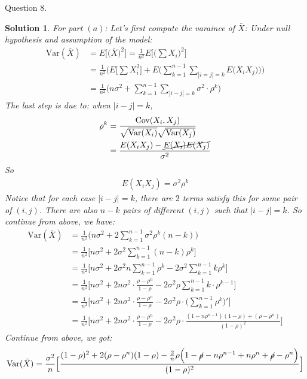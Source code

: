 \documentclass[11pt]{article}
\newtheorem{sol}{Solution}
\begin{document}
Question $8.$
\begin{sol}
	For part $(a)$:\vskip 2mm
	Let's first compute the varaince of $\bar{X}$:\vskip 2mm
	Under null hypothesis and assumption of the model:
	\begin{align*}
		\text{Var}(\bar{X}) &= E\Big[\Big(\bar{X}\Big)^2\Big] = \frac{1}{n^2}E\Big[\Big(\sum       X_i\Big)^2\Big]\\
		&= \frac{1}{n^2}\Big(E\Big[\sum X_i^2\Big] + E\Big(\sum_{k = 1}^{n - 1}\sum_{|i = j| = k}E\Big(X_iX_j\Big)\Big)\Big)\\
		&= \frac{1}{n^2}\Big(n\sigma^2 + \sum_{k = 1}^{n - 1}\sum_{|i - j| = k}\sigma^2\cdot \rho^k\Big)
	\end{align*}
	The last step is due to: when $|i - j|= k$, 
	\begin{align*}
		\rho^k &= \frac{\text{Cov}(X_i, X_j)}{\sqrt{\text{Var}(X_i)}\sqrt{\text{Var}(X_j)}}\\
		&= \frac{E(X_iX_j) - \cancel{E(X_i)E(X_j)}}{\sigma^2}
	\end{align*}
	So
	\begin{align*}
		E(X_iX_j) = \sigma^2\rho^{k}
	\end{align*}
	Notice that for each case $|i - j| = k$, there are $2$ terms satisfy this for same pair of $(i, j)$. There are also $n - k$ pairs of different $(i, j)$ such that $|i - j| = k$. So continue from above, we have:
	\begin{align*}
		\text{Var}(\bar{X}) &= \frac{1}{n^2}\Big(n\sigma^2 + 2\sum_{k = 1}^{n- 1}\sigma^2\rho^k(n - k)\Big)\\
		&= \frac{1}{n^2}\Big[n\sigma^2 + 2\sigma^2\sum_{k = 1}^{n - 1}(n - k)\rho^k\Big]\\
		&= \frac{1}{n^2}\Big[n\sigma^2 + 2\sigma^2n\sum_{k = 1}^{n - 1}\rho^k - 2\sigma^2\sum_{k = 1}^{n - 1}k\rho^k\Big]\\
		&= \frac{1}{n^2}\Big[n\sigma^2 + 2n\sigma^2\cdot \frac{\rho - \rho^n}{1 - \rho} - 2\sigma^2\rho\sum_{k = 1}^{n - 1}k\cdot\rho^{k - 1}\Big]\\
		&= \frac{1}{n^2}\Big[n\sigma^2 + 2n\sigma^2\cdot \frac{\rho - \rho^n}{1 - \rho} - 2\sigma^2\rho\cdot \Big(\sum_{k = 1}^{n - 1}\rho^k\Big)'\Big]\\
		&= \frac{1}{n^2}\Big[n\sigma^2 + 2n\sigma^2\cdot \frac{\rho - \rho^n}{1 - \rho} - 2\sigma^2\rho\cdot \frac{(1 - n\rho^{n - 1})(1 - \rho) + (\rho - \rho^n)}{(1 - \rho)^2}\Big]
	\end{align*}
	Continue from above, we got:
	\begin{align*}
		\text{Var}(\bar{X}) &= \frac{\sigma^2}{n}\Big[\frac{(1 - \rho)^2 + 2(\rho - \rho^n)(1 - \rho) - \frac{2}{n}\rho\Big(1 - \cancel{\rho} - n\rho^{n - 1} + n\rho^n + \cancel{\rho} - \rho^n\Big)}{(1 - \rho)^2}\Big]\\

\end{align*}
\end{sol}
\end{document}
